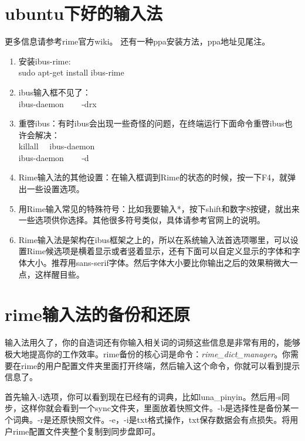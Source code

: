 \section{ubuntu下好的输入法}
更多信息请参考rime官方wiki。
还有一种ppa安装方法，ppa地址见尾注。
\begin{enumerate}
\item 安装ibus-rime:\\ sudo apt-get install ibus-rime
\item ibus输入框不见了：\\ ibus-daemon  ~~~  -drx
\item 重啓ibus：有时ibus会出现一些奇怪的问题，在终端运行下面命令重啓ibus也许会解决：\\ killall ~~ibus-daemon\\
             ibus-daemon ~~~ -d
\item Rime输入法的其他设置：在输入框调到Rime的状态的时候，按一下F4，就弹出一些设置选项。
\item 用Rime输入常见的特殊符号：比如我要输入*，按下shift和数字8按键，就出来一些选项供你选择。其他很多符号类似，具体请参考官网上的说明。
\item Rime输入法是架构在ibus框架之上的，所以在系统输入法首选项哪里，可以设置Rime候选项是横着显示或者竖着显示，还有下面可以自定义显示的字体和字体大小。推荐用sans-serif字体。然后字体大小要比你输出之后的效果稍微大一点，这样醒目些。
\end{enumerate}

\section{rime输入法的备份和还原}
输入法用久了，你的自造词还有你输入相关词的词频这些信息是非常有用的，能够极大地提高你的工作效率。rime备份的核心词是命令：\emph{rime\_{}dict\_{}manager}。你需要在rime的用户配置文件夹里面打开终端，然后输入这个命令，你就可以看到提示信息了。

首先输入-l选项，你可以看到现在已经有的词典，比如luna\_{}pinyin。然后用-s同步，这样你就会看到一个sync文件夹，里面放着快照文件。-b是选择性是备份某一个词典。-r是还原快照文件。-e，-i是txt格式操作，txt保存数据会有点损失。将用户rime配置文件夹整个复制到同步盘即可。

